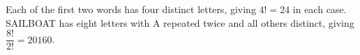 Each of the first two words has four distinct letters, giving $4!=\boxed{24}$ in each case. SAILBOAT has eight letters with A repeated twice and all others distinct, giving $\dfrac{8!}{2!}=\boxed{20160}$.
